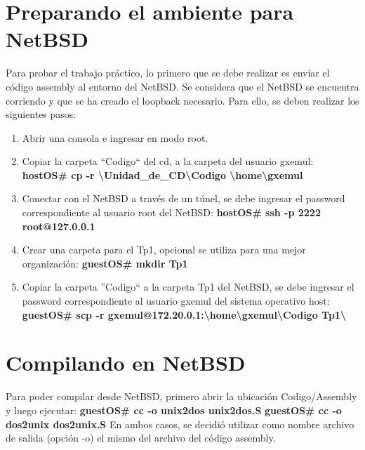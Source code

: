 \documentclass[a4paper,10pt]{article}
\begin{document}
\section{Preparando el ambiente para NetBSD}
  Para probar el trabajo pr\'actico, lo primero que se debe realizar es enviar el c\'odigo assembly al entorno
  del NetBSD. Se considera que el NetBSD se encuentra corriendo y que se ha creado el loopback necesario. Para ello, se deben realizar los siguientes pasos:
  \begin{enumerate}
   \item Abrir una consola e ingresar en modo root.
   \item Copiar la carpeta ``Codigo`` del cd, a la carpeta del usuario gxemul:
    \newline 
      {\bf hostOS\# cp -r \textbackslash Unidad\_de\_CD\textbackslash Codigo \textbackslash home\textbackslash gxemul}
   \item Conectar con el NetBSD a trav\'es de un t\'unel, se debe ingresar el password correspondiente al 
	 usuario root del NetBSD:
    \newline
      {\bf hostOS\# ssh -p 2222 root@127.0.0.1}
   \item Crear una carpeta para el Tp1, opcional se utiliza para una mejor organizaci\'on:
    \newline 
    {\bf guestOS\# mkdir Tp1}
   \item Copiar la carpeta ''Codigo`` a la carpeta Tp1 del NetBSD, se debe ingresar el password correspondiente al
         usuario gxemul del sistema operativo host:
   \newline
    {\bf guestOS\# scp -r gxemul@172.20.0.1:\textbackslash home\textbackslash gxemul\textbackslash Codigo \newline Tp1\textbackslash }
  \end{enumerate} 

\section{Compilando en NetBSD}
  Para poder compilar desde NetBSD, primero abrir la ubicaci\'on Codigo/Assembly y luego ejecutar:
  \newline
  {\bf guestOS\# cc -o unix2dos unix2dos.S} \newline
  {\bf guestOS\# cc -o dos2unix dos2unix.S}
  \newline
  En ambos casos, se decidi\'o utilizar como nombre archivo de salida (opci\'on -o) el mismo del archivo 
  del c\'odigo assembly.
\end{document}
